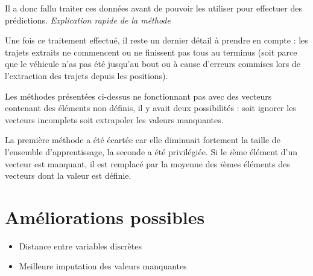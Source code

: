 \documentclass[letterpaper]{article}
\begin{document}
Il a donc fallu traiter ces données avant de pouvoir les utiliser pour effectuer des prédictions.
\textit{Explication rapide de la méthode} %

Une fois ce traitement effectué, il reste un dernier détail à prendre en compte : les trajets extraits ne commencent ou ne finissent pas tous au terminus (soit parce que le véhicule n'as pas été jusqu'au bout ou à cause d'erreurs commises lors de l'extraction des trajets depuis les positions).

Les méthodes présentées ci-dessus ne fonctionnant pas avec des vecteurs contenant des éléments non définis, il y avait deux possibilités : soit ignorer les vecteurs incomplets soit extrapoler les valeurs manquantes.

La première méthode a été écartée car elle diminuait fortement la taille de l'ensemble d'apprentissage, la seconde a été privilégiée. Si le $i$ème élément d'un vecteur est manquant, il est remplacé par la moyenne des $i$èmes éléments des vecteurs dont la valeur est définie.


\section{Améliorations possibles}

\begin{itemize}
    \item Distance entre variables discrètes
    \item Meilleure imputation des valeurs manquantes
\end{itemize}


\footnotesize


\end{document}
